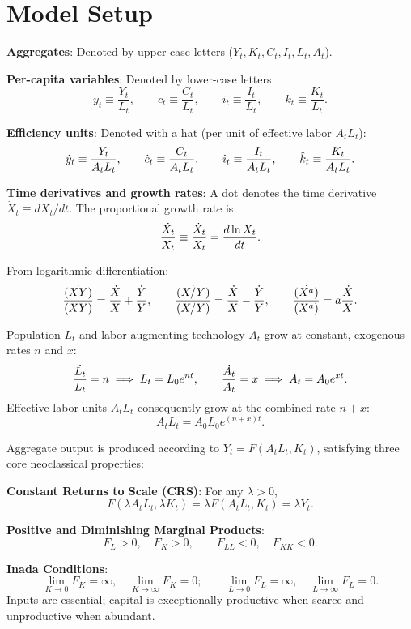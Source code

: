 \documentclass[11pt]{article}
\begin{document}

{\small\tableofcontents}
\newpage

\section{Model Setup}

\begin{flatlist}
  \item \textbf{Aggregates}: Denoted by upper-case letters ($Y_t, K_t, C_t, I_t, L_t, A_t$).
  \item \textbf{Per-capita variables}: Denoted by lower-case letters:
  \[
  y_t \equiv \frac{Y_t}{L_t}, \qquad c_t \equiv \frac{C_t}{L_t}, \qquad i_t \equiv \frac{I_t}{L_t}, \qquad k_t \equiv \frac{K_t}{L_t}.
  \]
  \item \textbf{Efficiency units}: Denoted with a hat (per unit of effective labor $A_t L_t$):
  \[
  \hat{y}_t \equiv \frac{Y_t}{A_t L_t}, \qquad \hat{c}_t \equiv \frac{C_t}{A_t L_t}, \qquad \hat{\imath}_t \equiv \frac{I_t}{A_t L_t}, \qquad \hat{k}_t \equiv \frac{K_t}{A_t L_t}.
  \]
  \item \textbf{Time derivatives and growth rates}: A dot denotes the time derivative $\dot{X}_t \equiv dX_t / dt$. The proportional growth rate is:
  \[
  \frac{\dot{X_t}}{X_t} \equiv \frac{\dot{X}_t}{X_t} = \frac{d\ln X_t}{dt}.
  \]
\end{flatlist}

From logarithmic differentiation:
\[
\frac{\dot{(XY)}}{(XY)} = \frac{\dot{X}}{X} + \frac{\dot{Y}}{Y}, \qquad \frac{\dot{(X/Y)}}{(X/Y)} = \frac{\dot{X}}{X} - \frac{\dot{Y}}{Y}, \qquad \frac{\dot{(X^a)}}{(X^a)} = a\frac{\dot{X}}{X}.
\]

Population $L_t$ and labor-augmenting technology $A_t$ grow at constant, exogenous rates $n$ and $x$:
\[
\frac{\dot{L_t}}{L_t} = n \implies L_t = L_0 e^{nt}, \qquad \frac{\dot{A_t}}{A_t} = x \implies A_t = A_0 e^{xt}.
\]
Effective labor units $A_t L_t$ consequently grow at the combined rate $n + x$:
\[
A_t L_t = A_0 L_0 e^{(n+x)t}.
\]

Aggregate output is produced according to $Y_t = F(A_t L_t, K_t)$, satisfying three core neoclassical properties:
\begin{flatnum}
  \item \textbf{Constant Returns to Scale (CRS)}: For any $\lambda > 0$,
  \[
  F(\lambda A_t L_t, \lambda K_t) = \lambda F(A_t L_t, K_t) = \lambda Y_t.
  \]
  \item \textbf{Positive and Diminishing Marginal Products}:
  \[
  F_L > 0, \quad F_K > 0, \qquad F_{LL} < 0, \quad F_{KK} < 0.
  \]
  \item \textbf{Inada Conditions}:
  \[
  \lim_{K \to 0} F_K = \infty, \quad \lim_{K \to \infty} F_K = 0; \qquad \lim_{L \to 0} F_L = \infty, \quad \lim_{L \to \infty} F_L = 0.
  \]
  Inputs are essential; capital is exceptionally productive when scarce and unproductive when abundant.
\end{flatnum}
\end{document}
